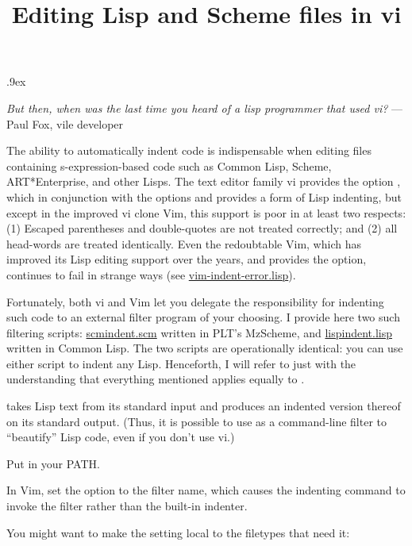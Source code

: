 
\let\TZPtexlayout=1
\parskip=5pt
\ifx\shipout\UNDEFINED\parskip .9ex \fi
\title{Editing Lisp and Scheme files in vi}

\ifx\shipout\UNDEFINED
\centerline{}
\fi

{\obeylines\raggedleft
{\it But then, when was the last time you heard
of a lisp programmer that used vi?}
---Paul Fox, vile developer
}

\bigskip

\noindent
The ability to automatically indent code is indispensable when editing
files containing s-expression-based code such as Common Lisp, Scheme,
ART*Enterprise, and other Lisps.
The text editor family vi provides the option , which in
conjunction with the options  and 
provides a form of Lisp indenting, but except in the improved vi clone
Vim, this support is poor in at least two respects: (1) Escaped
parentheses and double-quotes are not treated correctly; and (2) all
head-words are
treated identically.  Even the redoubtable Vim, which has improved its Lisp editing
support over the years, and provides the  option, continues to fail in strange ways (see
\url{vim-indent-error.lisp}).

Fortunately, both vi and Vim let you delegate the responsibility for indenting such
code to an external filter program of your choosing.  I provide here two
such filtering scripts: 
\url{scmindent.scm} written in PLT's MzScheme, and  
\url{lispindent.lisp} written in Common Lisp.  The two scripts are
operationally identical: you can use either script to indent any Lisp. 
Henceforth, I will refer to just  with the understanding that
everything mentioned applies equally to .

 takes
Lisp text from its standard input and produces an indented version
thereof on its standard output.  (Thus, it is possible to use
 as a command-line filter to ``beautify'' Lisp code, even if
you don't use vi.)

Put  in your PATH.

In Vim, set the  option to the filter name, which causes the
indenting command \p{=} to invoke the filter rather than the built-in
indenter.

You might want to make the  setting local to the filetypes
that need it:



